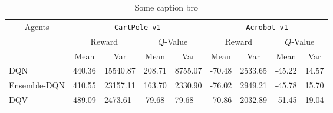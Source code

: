 \begin{table*}
\centering
\setlength{\extrarowheight}{0pt}
\addtolength{\extrarowheight}{\aboverulesep}
\addtolength{\extrarowheight}{\belowrulesep}
\setlength{\aboverulesep}{0pt}
\setlength{\belowrulesep}{0pt}
\caption{Some caption bro}\label{table:results_diff}
\begin{tabular}{l|cl|cl|cl|cl}
\toprule
\multicolumn{1}{c|}{\multirow{3}{*}{Agents}} & \multicolumn{4}{c|}{\texttt{CartPole-v1}}                                                                                                                                   & \multicolumn{4}{c}{\texttt{Acrobot-v1}}                                                                       \\
\cline{2-9}
\multicolumn{1}{c|}{}                        & \multicolumn{2}{c|}{Reward}                                                          & \multicolumn{2}{c|}{$Q$-Value}                                                       & \multicolumn{2}{c|}{Reward}                           & \multicolumn{2}{c}{$Q$-Value}                         \\
\multicolumn{1}{c|}{}                        & Mean                                                      & \multicolumn{1}{c|}{Var} & Mean                                                      & \multicolumn{1}{c|}{Var} & Mean                       & \multicolumn{1}{c|}{Var} & Mean                       & \multicolumn{1}{c}{Var}  \\
\hline
DQN                                          & {\cellcolor[rgb]{1,0.988,0.62}}440.36                     & 15540.87                 & {\cellcolor[rgb]{1,0.988,0.62}}208.71                     & 8755.07                  & -70.48                     & 2533.65                  & -45.22                     & 14.57                    \\
Ensemble-DQN                                 & \multicolumn{1}{l}{{\cellcolor[rgb]{1,0.988,0.62}}410.55} & 23157.11                 & \multicolumn{1}{l}{{\cellcolor[rgb]{1,0.988,0.62}}163.70} & 2330.90                  & \multicolumn{1}{l}{-76.02} & 2949.21                  & \multicolumn{1}{l}{-45.78} & 15.70                    \\
DQV                                          & {\cellcolor[rgb]{1,0.988,0.62}}489.09                     & 2473.61                  & 79.68                                                     & 79.68                    & -70.86                     & 2032.89                  & -51.45                     & 19.04                    \\

\end{tabular}
\end{table*}
